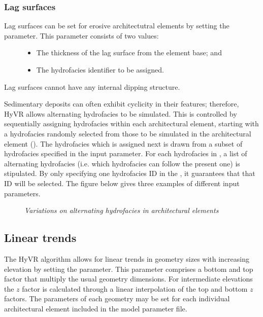 \documentclass[letterpaper,10pt,english]{sphinxmanual}
\begin{document}
\subsubsection{Lag surfaces}
\label{methods:lag-surfaces}\begin{description}
\item[{Lag surfaces can be set for erosive architectutral elements by setting the  parameter. This parameter consists of two values:}] \leavevmode\begin{itemize}
\item {} 
The thickness of the lag surface from the element base; and

\item {} 
The hydrofacies identifier to be assigned.

\end{itemize}

\end{description}

Lag surfaces cannot have any internal dipping structure.

Sedimentary deposits can often exhibit cyclicity in their features; therefore, HyVR allows alternating hydrofacies to be simulated. This is controlled by sequentially assigning hydrofacies within each architectural element, starting with a hydrofacies randomly selected from those to be simulated in the architectural element (). The hydrofacies which is assigned next is drawn from a subset of hydrofacies specified in the  input parameter. For each hydrofacies in , a list of alternating hydrofacies (i.e. which hydrofacies can follow the present one) is stipulated. By only specifying one hydrofacies ID in the , it guarantees that that ID will be selected. The figure below gives three examples of different input parameters.
\begin{figure}[htbp]
\centering
\capstart

\noindent{}
\caption{\emph{Variations on alternating hydrofacies in architectural elements}}\label{methods:altfac}\label{methods:id13}\end{figure}


\subsection{Linear trends}
\label{methods:linear-trends}
The HyVR algorithm  allows for linear trends in geometry sizes with increasing elevation by setting the  parameter. This parameter comprises a bottom and top factor that multiply the usual geometry dimensions. For intermediate elevations the \(z\) factor is calculated through a linear interpolation of the top and bottom \(z\) factors. The parameters of each geometry may be set for each individual architectural element included in the model parameter file.
\end{document}
